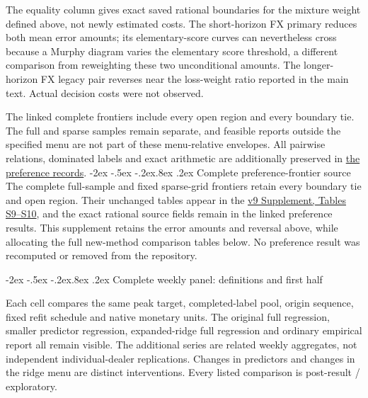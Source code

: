 \documentclass[10pt,a4paper]{article}
\makeatletter
\renewcommand\section{\@startsection{section}{1}{\z@}%
  {-2ex \@plus -.5ex \@minus -.2ex}{.8ex \@plus .2ex}%
  {\normalfont\large\bfseries}}
\makeatother
\begin{document}
The equality column gives exact saved rational boundaries for the mixture
weight defined above, not newly estimated costs. The short-horizon FX primary reduces both mean error amounts;
its elementary-score curves can nevertheless cross because a Murphy diagram
varies the elementary score threshold, a different comparison from reweighting
these two unconditional amounts. The longer-horizon FX legacy pair reverses
near the loss-weight ratio reported in the main text. Actual decision costs
were not observed.

The linked complete frontiers include every open region and every boundary tie.
The full and sparse samples remain separate, and feasible reports outside the
specified menu are not part of these menu-relative envelopes. All pairwise
relations, dominated labels and exact arithmetic are additionally preserved in
\href{https://github.com/ByronLi0207/financial-mathematics-paper-20261020/blob/revision-v7-final/results/revision-20261022/preference-robustness/README.md}{the preference records}.\section{Complete preference-frontier source}\label{sup:frontier-0}\label{sup:frontier-8}
The complete full-sample and fixed sparse-grid frontiers retain every boundary tie and open region. Their unchanged tables appear in the \href{https://github.com/ByronLi0207/financial-mathematics-paper-20261020/blob/0d2526cc69092c5158437a0509613bac5e86d47f/submission-jof/supplement.pdf}{v9 Supplement, Tables S9--S10}, and the exact rational source fields remain in the linked preference results. This supplement retains the error amounts and reversal above, while allocating the full new-method comparison tables below. No preference result was recomputed or removed from the repository.

\section{Complete weekly panel: definitions and first half}\label{sup:panel}

Each cell compares the same peak target, completed-label pool,
origin sequence, fixed refit schedule and native monetary units. The original
full regression, smaller predictor regression, expanded-ridge full regression
and ordinary empirical report all remain visible. The additional series are
related weekly aggregates, not independent individual-dealer replications.
Changes in predictors and changes in the ridge menu are distinct interventions.
Every listed comparison is post-result / exploratory.
\end{document}
